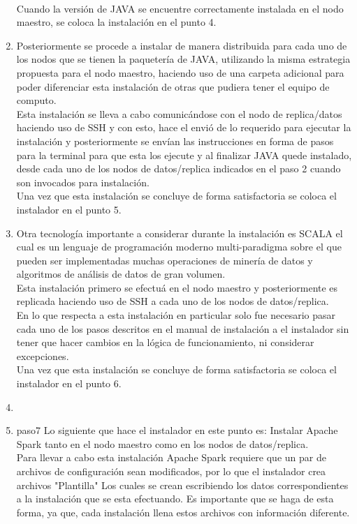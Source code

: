 \begin{enumerate}
	\\ 
	Cuando la versión de JAVA se encuentre correctamente instalada en el nodo maestro, se coloca la instalación en el punto 4.
	\item Posteriormente se procede a instalar de manera distribuida para cada uno de los nodos que se tienen la paquetería de JAVA, utilizando la misma estrategia propuesta para el nodo maestro, haciendo uso de una carpeta adicional para poder diferenciar esta instalación de otras que pudiera tener el equipo de computo. \\
	Esta instalación se lleva a cabo comunicándose con el nodo de replica/datos haciendo uso de SSH y con esto, hace el envió de lo requerido para ejecutar la instalación y posteriormente se envían las instrucciones en forma de pasos para la terminal para que esta los ejecute y al finalizar JAVA quede instalado, desde cada uno de los nodos de datos/replica indicados en el paso 2 cuando son invocados para instalación.\\
	Una vez que esta instalación se concluye de forma satisfactoria se coloca el instalador en el punto 5.
	\item Otra tecnología importante a considerar durante la instalación es SCALA el cual es un lenguaje de programación moderno multi-paradigma sobre el que pueden ser implementadas muchas operaciones de minería de datos y algoritmos de análisis de datos de gran volumen.\\
	Esta instalación primero se efectuá en el nodo maestro y posteriormente es replicada haciendo uso de SSH a cada uno de los nodos de datos/replica. \\
	En lo que respecta a esta instalación en particular solo fue necesario pasar cada uno de los pasos descritos en el manual de instalación a el instalador sin tener que hacer cambios en la lógica de funcionamiento, ni considerar excepciones. \\
	Una vez que esta instalación se concluye de forma satisfactoria se coloca el instalador en el punto 6.
	\item \item{paso7} Lo siguiente que hace el instalador en este punto es: Instalar Apache Spark tanto en el nodo maestro como en los nodos de datos/replica.\\
	Para llevar a cabo esta instalación Apache Spark requiere que un par de archivos de configuración sean modificados, por lo que el instalador crea archivos "Plantilla" Los cuales se crean escribiendo los datos correspondientes a la instalación que se esta efectuando. Es importante que se haga de esta forma, ya que, cada instalación llena estos archivos con información diferente.\\

\end{enumerate}
